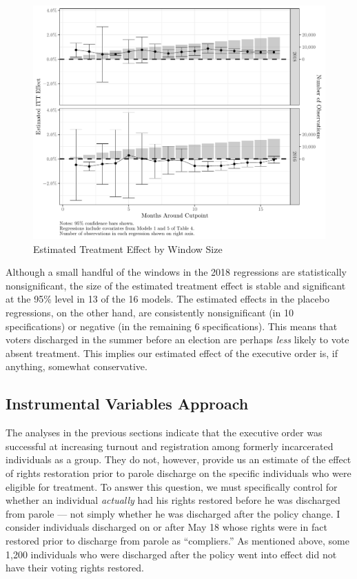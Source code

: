 \documentclass[
  12pt,
]{article}
\begin{document}
\begin{figure}[H]

{\centering \includegraphics{table_embed_files/figure-latex/sensitivity-1} 

}

\caption{\label{fig:sens}Estimated Treatment Effect by Window Size}\label{fig:sensitivity}
\end{figure}

Although a small handful of the windows in the 2018 regressions are statistically nonsignificant, the size of the estimated treatment effect is stable and significant at the 95\% level in 13 of the 16 models. The estimated effects in the placebo regressions, on the other hand, are consistently nonsignificant (in 10 specifications) or negative (in the remaining 6 specifications). This means that voters discharged in the summer before an election are perhaps \emph{less} likely to vote absent treatment. This implies our estimated effect of the executive order is, if anything, somewhat conservative.

\hypertarget{instrumental-variables-approach}{%
\subsection*{Instrumental Variables Approach}\label{instrumental-variables-approach}}

The analyses in the previous sections indicate that the executive order was successful at increasing turnout and registration among formerly incarcerated individuals as a group. They do not, however, provide us an estimate of the effect of rights restoration prior to parole discharge on the specific individuals who were eligible for treatment. To answer this question, we must specifically control for whether an individual \emph{actually} had his rights restored before he was discharged from parole --- not simply whether he was discharged after the policy change. I consider individuals discharged on or after May 18 whose rights were in fact restored prior to discharge from parole as ``compliers.'' As mentioned above, some 1,200 individuals who were discharged after the policy went into effect did not have their voting rights restored.
\end{document}
